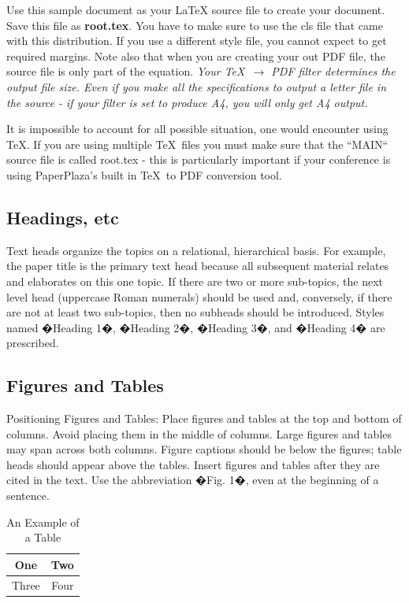 \documentclass[letterpaper, 10 pt, conference]{ieeeconf}  %
\begin{document}
Use this sample document as your LaTeX source file to create your document. Save this file as {\bf root.tex}. You have to make sure to use the cls file that came with this distribution. If you use a different style file, you cannot expect to get required margins. Note also that when you are creating your out PDF file, the source file is only part of the equation. {\it Your \TeX\ $\rightarrow$ PDF filter determines the output file size. Even if you make all the specifications to output a letter file in the source - if your filter is set to produce A4, you will only get A4 output. }

It is impossible to account for all possible situation, one would encounter using \TeX. If you are using multiple \TeX\ files you must make sure that the ``MAIN`` source file is called root.tex - this is particularly important if your conference is using PaperPlaza's built in \TeX\ to PDF conversion tool.

\subsection{Headings, etc}

Text heads organize the topics on a relational, hierarchical basis. For example, the paper title is the primary text head because all subsequent material relates and elaborates on this one topic. If there are two or more sub-topics, the next level head (uppercase Roman numerals) should be used and, conversely, if there are not at least two sub-topics, then no subheads should be introduced. Styles named �Heading 1�, �Heading 2�, �Heading 3�, and �Heading 4� are prescribed.

\subsection{Figures and Tables}

Positioning Figures and Tables: Place figures and tables at the top and bottom of columns. Avoid placing them in the middle of columns. Large figures and tables may span across both columns. Figure captions should be below the figures; table heads should appear above the tables. Insert figures and tables after they are cited in the text. Use the abbreviation �Fig. 1�, even at the beginning of a sentence.

\begin{table}[h]
\caption{An Example of a Table}
\label{table_example}
\begin{center}
\begin{tabular}{|c||c|}
\hline
One & Two\\
\hline
Three & Four\\
\hline
\end{tabular}
\end{center}
\end{table}
\end{document}
